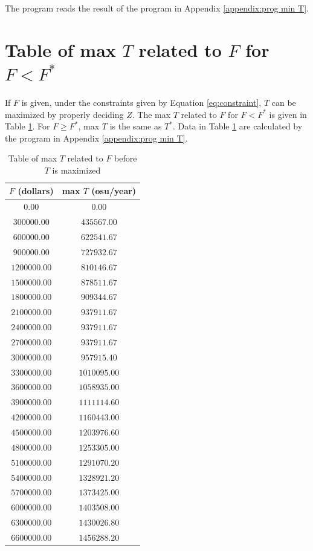 \documentclass{article}
\begin{document}
The program reads the result of the program in Appendix \ref{appendix:prog min T}.

\section{Table of max $T$ related to $F$ for $F<F^*$}

If $F$ is given, under the constraints given by Equation \ref{eq:constraint}, $T$ can be maximized by properly deciding $Z$.
The max $T$ related to $F$ for $F<F^*$ is given in Table \ref{tab:max T funds}.
For $F\ge F^*$, max $T$ is the same as $T^*$.
Data in Table \ref{tab:max T funds} are calculated by the program in Appendix \ref{appendix:prog min T}.

\begin{longtable}{cc}
\caption{Table of max $T$ related to $F$ before $T$ is maximized}
\label{tab:max T funds}\\
\toprule
$F$ (dollars) & max $T$ (osu/year)\\
\midrule
$0.00$ & $0.00$\\
$300000.00$ & $435567.00$\\
$600000.00$ & $622541.67$\\
$900000.00$ & $727932.67$\\
$1200000.00$ & $810146.67$\\
$1500000.00$ & $878511.67$\\
$1800000.00$ & $909344.67$\\
$2100000.00$ & $937911.67$\\
$2400000.00$ & $937911.67$\\
$2700000.00$ & $937911.67$\\
$3000000.00$ & $957915.40$\\
$3300000.00$ & $1010095.00$\\
$3600000.00$ & $1058935.00$\\
$3900000.00$ & $1111114.60$\\
$4200000.00$ & $1160443.00$\\
$4500000.00$ & $1203976.60$\\
$4800000.00$ & $1253305.00$\\
$5100000.00$ & $1291070.20$\\
$5400000.00$ & $1328921.20$\\
$5700000.00$ & $1373425.00$\\
$6000000.00$ & $1403508.00$\\
$6300000.00$ & $1430026.80$\\
$6600000.00$ & $1456288.20$\\

\end{longtable}
\end{document}
